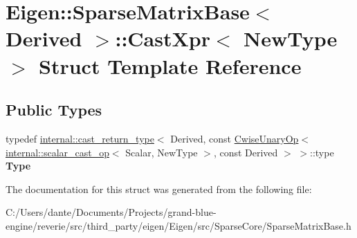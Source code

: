 \hypertarget{struct_eigen_1_1_sparse_matrix_base_1_1_cast_xpr}{}\section{Eigen\+::Sparse\+Matrix\+Base$<$ Derived $>$\+::Cast\+Xpr$<$ New\+Type $>$ Struct Template Reference}
\label{struct_eigen_1_1_sparse_matrix_base_1_1_cast_xpr}
\subsection*{Public Types}
\begin{DoxyCompactItemize}
\item 
\mbox{\label{struct_eigen_1_1_sparse_matrix_base_1_1_cast_xpr_a2d3a3873b679db8c1f25da7a1074e52a}} 
typedef \mbox{\hyperlink{struct_eigen_1_1internal_1_1cast__return__type}{internal\+::cast\+\_\+return\+\_\+type}}$<$ Derived, const \mbox{\hyperlink{class_eigen_1_1_cwise_unary_op}{Cwise\+Unary\+Op}}$<$ \mbox{\hyperlink{struct_eigen_1_1internal_1_1scalar__cast__op}{internal\+::scalar\+\_\+cast\+\_\+op}}$<$ Scalar, New\+Type $>$, const Derived $>$ $>$\+::type {\bfseries Type}
\end{DoxyCompactItemize}


The documentation for this struct was generated from the following file\+:\begin{DoxyCompactItemize}
\item 
C\+:/\+Users/dante/\+Documents/\+Projects/grand-\/blue-\/engine/reverie/src/third\+\_\+party/eigen/\+Eigen/src/\+Sparse\+Core/Sparse\+Matrix\+Base.\+h\end{DoxyCompactItemize}

